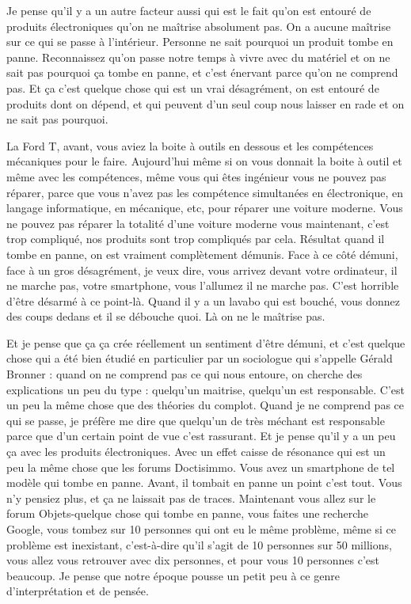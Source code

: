 \begin{small}
Je pense qu'il y a un autre facteur aussi qui est le fait qu'on est entouré de produits électroniques qu'on ne maîtrise absolument pas. On a aucune maîtrise sur ce qui se passe à l'intérieur. Personne ne sait pourquoi un produit tombe en panne. Reconnaissez qu'on passe notre temps à vivre avec du matériel et on ne sait pas pourquoi ça tombe en panne, et c'est énervant parce qu'on ne comprend pas. Et ça c'est quelque chose qui est un vrai désagrément, on est entouré de produits dont on dépend, et qui peuvent d'un seul coup nous laisser en rade et on ne sait pas pourquoi. 

La Ford T, avant, vous aviez la boite à outils en dessous et les compétences mécaniques pour le faire. Aujourd'hui même si on vous donnait la boite à outil et même avec les compétences, même vous qui êtes ingénieur vous ne pouvez pas réparer, parce que vous n'avez pas les compétence simultanées en  électronique, en langage informatique, en mécanique, etc, pour réparer une voiture moderne. Vous ne pouvez pas réparer la totalité d'une voiture moderne vous maintenant, c'est trop compliqué, nos produits sont trop compliqués par cela. Résultat quand il tombe en panne, on est vraiment complètement démunis. Face à ce côté démuni, face à un gros désagrément, je veux dire, vous arrivez devant votre ordinateur, il ne marche pas, votre smartphone, vous l'allumez il ne marche pas. C'est horrible d'être désarmé à ce point-là. Quand il y a un lavabo qui est bouché, vous donnez des coups dedans et il se débouche quoi. Là on ne le maîtrise pas. 

Et je pense que ça ça crée réellement un sentiment d'être démuni, et c'est quelque chose qui a été bien étudié en particulier par un sociologue qui s'appelle Gérald Bronner : quand on ne comprend pas ce qui nous entoure, on cherche des explications un peu du type : quelqu'un maitrise, quelqu'un est responsable. C'est un peu la même chose que des théories du complot. Quand je ne comprend pas ce qui se passe, je préfère me dire que quelqu'un de très méchant est responsable parce que d'un certain point de vue c'est rassurant. Et je pense qu'il y a un peu ça avec les produits électroniques. Avec un effet caisse de résonance qui est un peu la même chose que les forums Doctisimmo. Vous avez un smartphone de tel modèle qui tombe en panne. Avant, il tombait en panne un point c'est tout. Vous n'y pensiez plus, et ça ne laissait pas de traces. Maintenant vous allez sur le forum Objets-quelque chose qui tombe en panne, vous faites une recherche Google, vous tombez sur 10 personnes qui ont eu le même problème, même si ce problème est inexistant, c'est-à-dire qu'il s'agit de 10 personnes sur 50 millions, vous allez vous retrouver avec dix personnes, et pour vous 10 personnes c'est beaucoup. Je pense que notre époque pousse un petit peu à ce genre d'interprétation et de pensée. 


\end{small}
